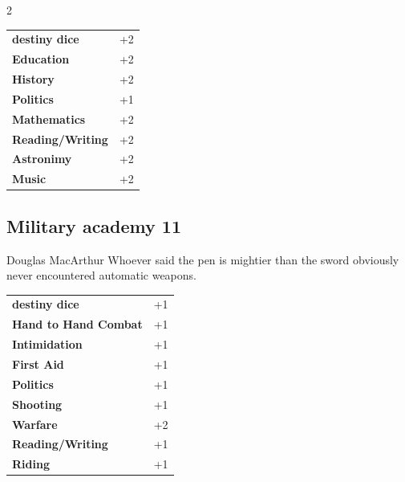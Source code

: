 \begin{multicols}{2}
\begin{tcolorbox}
\begin{tabular}{@{}ll@{}}
    \textbf{destiny dice} & +2\\
    \textbf{Education} & +2\\
    \textbf{History} & +2\\
    \textbf{Politics} & +1\\
    \textbf{Mathematics} & +2\\
    \textbf{Reading/Writing} & +2\\
    \textbf{Astronimy} & +2\\
    \textbf{Music} & +2\\
\end{tabular}


\end{tcolorbox}

\begin{tcolorbox}
    \subsection*{Military academy \hfill \small{11 }}
    \tcblower


\begin{pquote}{Douglas MacArthur}
Whoever said the pen is mightier than the sword obviously never encountered automatic weapons.
\end{pquote}

\vspace{3mm}

\begin{tabular}{@{}ll@{}}
    \textbf{destiny dice} & +1\\
    \textbf{Hand to Hand Combat} & +1\\
    \textbf{Intimidation} & +1\\
    \textbf{First Aid} & +1\\
    \textbf{Politics} & +1\\
    \textbf{Shooting} & +1\\
    \textbf{Warfare} & +2\\
    \textbf{Reading/Writing} & +1\\
    \textbf{Riding} & +1\\
\end{tabular}



\end{tcolorbox}
\end{multicols}
